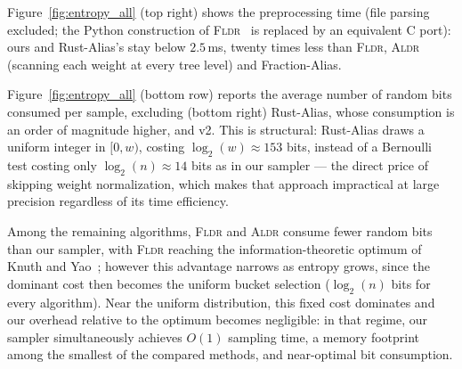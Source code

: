 Figure~\ref{fig:entropy_all} (top right) shows the preprocessing time (file parsing excluded; the Python construction of \textsc{Fldr}~\cite{SFRM19} is replaced by an equivalent C port): ours and Rust-Alias's stay below $2.5$\,ms, twenty times less than \textsc{Fldr}, \textsc{Aldr} (scanning each weight at every tree level) and Fraction-Alias.

Figure~\ref{fig:entropy_all} (bottom row) reports the average number of random bits consumed per sample, excluding (bottom right) Rust-Alias, whose consumption is an order of magnitude higher, and v2. This is structural: Rust-Alias draws a uniform integer in $[0, w)$, costing $\log_2(w) \approx 153$ bits, instead of a Bernoulli test costing only $\log_2(n) \approx 14$ bits as in our sampler --- the direct price of skipping weight normalization, which makes that approach impractical at large precision regardless of its time efficiency.

Among the remaining algorithms, \textsc{Fldr} and \textsc{Aldr} consume fewer random bits than our sampler, with \textsc{Fldr} reaching the information-theoretic optimum of Knuth and Yao~\cite{KY76}; however this advantage narrows as entropy grows, since the dominant cost then becomes the uniform bucket selection ($\log_2(n)$ bits for every algorithm). Near the uniform distribution, this fixed cost dominates and our overhead relative to the optimum becomes negligible: in that regime, our sampler simultaneously achieves $O(1)$ sampling time, a memory footprint among the smallest of the compared methods, and near-optimal bit consumption.
